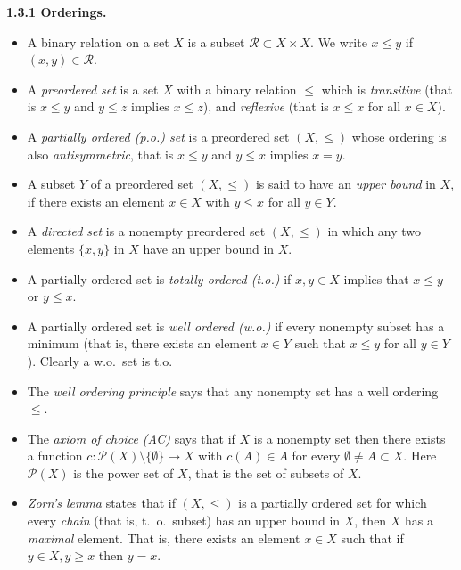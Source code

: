 \documentclass[12pt]{article}
\begin{document}
\begin{flushleft}
  { \bf 1.3.1
 Orderings.}
\end{flushleft}
\begin{itemize}

\item A binary relation on a set $X$ is a subset ${\mathcal R} \subset X \times X$.  We write
$x \leq y$ if $(x,y) \in {\mathcal R}$.

\item A {\em preordered set} is a set $X$ with a  binary relation $\leq$ which is
 {\em transitive} (that is $x \leq y$ and $y \leq z$ implies $x \leq z$), and
{\em reflexive} (that is $x \leq x$ for all $x \in X$).


\item  A {\em partially ordered (p.o.) set} is a preordered set $(X, \leq)$
whose ordering is also {\em antisymmetric}, that is $x \leq y$ and
$y \leq x$ implies $x = y$.

\item  A subset $Y$ of a preordered set $(X, \leq)$ is said to have an
{\em upper bound} in $X$, if there exists an element $x \in X$ with
$y \leq x$ for all $y \in Y$.


\item  A {\em directed set} is  a nonempty preordered set $(X, \leq)$
in which any two elements $\{ x,y \} $ in $X$ have an upper bound in
$X$.


\item  A partially ordered set is {\em totally ordered (t.o.)}
if $x,y \in X$ implies that  $x \leq y$ or $y \leq x$.

\item  A partially ordered set is {\em well ordered (w.o.)} if
every nonempty subset has a minimum (that is, there exists an
element $x \in Y$ such that $x \leq y$ for all $y \in Y$). Clearly a
w.o.\ set is t.o.

\item  The {\em well ordering principle} says that any nonempty set has
a well ordering $\leq$.

\item  The {\em axiom of choice (AC)} says that if $X$ is a nonempty set
then there exists a function $c : {\mathcal P}(X) \setminus \{
\emptyset \} \to X$ with $c(A) \in A$ for every $\emptyset \neq A
\subset X$.   Here ${\mathcal P}(X)$ is the power set of $X$, that
is the set of subsets of $X$.


\item {\em Zorn's lemma} states that if $(X, \leq)$ is a
partially ordered set for which every {\em chain} (that is, t.\ o.\
subset) has an upper bound in $X$, then $X$ has a {\em maximal}
element.  That is, there exists an element $x \in X$ such that if $y
\in X, y \geq x$ then $y = x$.



\end{itemize}
\end{document}
